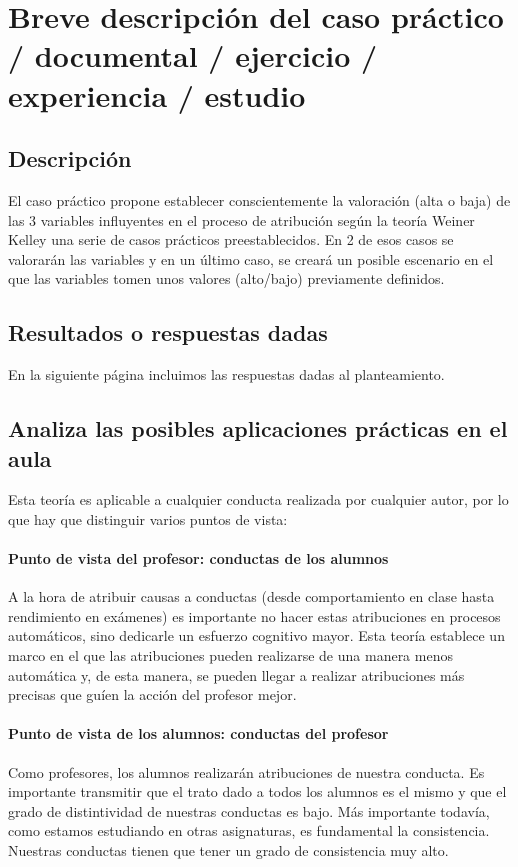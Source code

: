 \documentclass[palatino,nochap]{apuntesURJC}
\begin{document}
\section{Breve descripción del caso práctico / documental / ejercicio / experiencia / estudio}

\subsection{Descripción}
El caso práctico propone establecer conscientemente la valoración (alta o baja) de las 3 variables influyentes en el proceso de atribución según la teoría Weiner Kelley una serie de casos prácticos preestablecidos.
%
En 2 de esos casos se valorarán las variables y en un último caso, se creará un posible escenario en el que las variables tomen unos valores (alto/bajo) previamente definidos.

\subsection{Resultados o respuestas dadas}

En la siguiente página incluimos las respuestas dadas al planteamiento.



\subsection{Analiza las posibles aplicaciones prácticas en el aula}

Esta teoría es aplicable a cualquier conducta realizada por cualquier autor, por lo que hay que distinguir varios puntos de vista:

\paragraph{Punto de vista del profesor: conductas de los alumnos} A la hora de atribuir causas a conductas (desde comportamiento en clase hasta rendimiento en exámenes) es importante no hacer estas atribuciones en procesos automáticos, sino dedicarle un esfuerzo cognitivo mayor. 
%
Esta teoría establece un marco en el que las atribuciones pueden realizarse de una manera menos automática y, de esta manera, se pueden llegar a realizar atribuciones más precisas que guíen la acción del profesor mejor. 

\paragraph{Punto de vista de los alumnos: conductas del profesor} Como profesores,  los alumnos realizarán atribuciones de nuestra conducta. 
%
Es importante transmitir que el trato dado a todos los alumnos es el mismo y que el grado de distintividad de nuestras conductas es bajo. 
%
Más importante todavía, como estamos estudiando en otras asignaturas, es fundamental la consistencia. 
%
Nuestras conductas tienen que tener un grado de consistencia muy alto.
\end{document}

